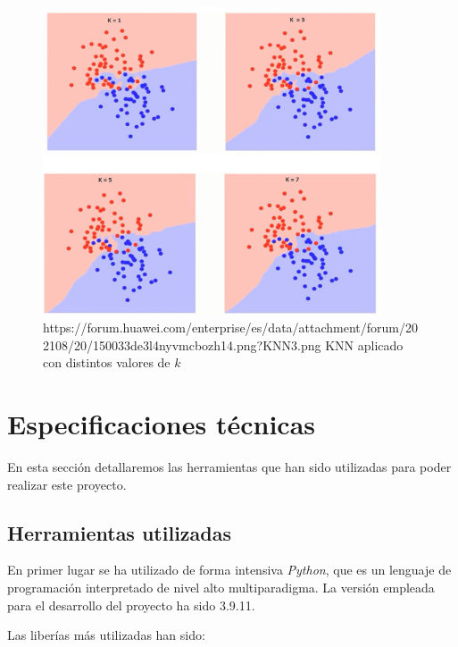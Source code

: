                 \begin{figure}[h]
                    \centering
                    \includegraphics[width=10cm]{archivos/3.Tecnologias/KNN/KNNImage}
                    \caption{https://forum.huawei.com/enterprise/es/data/attachment/forum/202108/20/150033de3l4nyvmcbozh14.png?KNN3.png KNN aplicado con distintos valores de $k$}
                    \label{KNNImage}
                \end{figure}

            

    \section{Especificaciones técnicas}

        En esta sección detallaremos las herramientas que han sido utilizadas para poder realizar este proyecto.


        \subsection{Herramientas utilizadas}
            En primer lugar se ha utilizado de forma intensiva \textit{Python}, que es un lenguaje de programación interpretado de nivel alto multiparadigma. La versión empleada para el desarrollo del proyecto ha sido 3.9.11. \cite{Python}
            
            Las liberías más utilizadas han sido:


